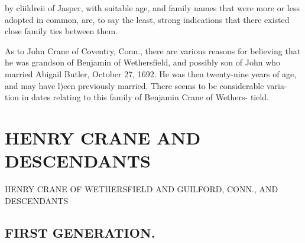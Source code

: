 \documentclass[oneside]{book}
\begin{document}
by cliildreii of Jasper, with suitable age, and family names that 
were more or less adopted in common, are, to say the least, 
strong indications that there existed close family ties between 
them. 

As to John Crane of Coventry, Conn., there are various reasons 
for believing that he was grandson of Benjamin of Wethersfield, 
and possibly son of John who married Abigail Butler, October 
27, 1692. He was then twenty-nine years of age, and may have 
l)een previously married. There seems to be considerable varia- 
tion in dates relating to this family of Benjamin Crane of Wethers- 
tield. 

\chapter{HENRY CRANE AND DESCENDANTS}

HENRY CRANE OF WETHERSFIELD AND GUILFORD, CONN., AND DESCENDANTS



\section{FIRST GENERATION.}
\end{document}
